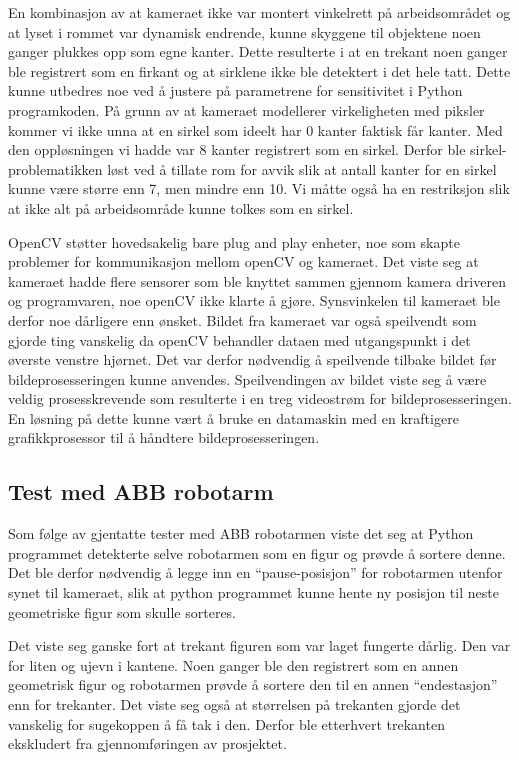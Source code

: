 \documentclass[conference]{IEEEtran}
\begin{document}
        En kombinasjon av at kameraet ikke var montert vinkelrett på arbeidsområdet og at lyset i rommet var dynamisk endrende, kunne skyggene til 
        objektene noen ganger plukkes opp som egne kanter. Dette resulterte i at en trekant noen ganger ble registrert som en firkant og at sirklene 
        ikke ble detektert i det hele tatt. Dette kunne utbedres noe ved å justere på parametrene for sensitivitet i Python programkoden. På grunn av 
        at kameraet modellerer virkeligheten med piksler kommer vi ikke unna at en sirkel som ideelt har 0 kanter faktisk får kanter. Med den 
        oppløsningen vi hadde var 8 kanter registrert som en sirkel. Derfor ble sirkel-problematikken løst ved å tillate rom for avvik slik at antall 
        kanter for en sirkel kunne være større enn 7, men mindre enn 10. Vi måtte også ha en restriksjon slik at ikke alt på arbeidsområde kunne tolkes 
        som en sirkel. 

        OpenCV støtter hovedsakelig bare plug and play enheter, noe som skapte problemer for kommunikasjon mellom openCV og kameraet. Det viste seg at 
        kameraet hadde flere sensorer som ble knyttet sammen gjennom kamera driveren og programvaren, noe openCV ikke klarte å gjøre. Synsvinkelen til 
        kameraet ble derfor noe dårligere enn ønsket. Bildet fra kameraet var også speilvendt som gjorde ting vanskelig da openCV behandler dataen med 
        utgangspunkt i det øverste venstre hjørnet. Det var derfor nødvendig å speilvende tilbake bildet før bildeprosesseringen kunne anvendes. 
        Speilvendingen av bildet viste seg å være veldig prosesskrevende som resulterte i en treg videostrøm for bildeprosesseringen. En løsning på dette 
        kunne vært å bruke en datamaskin med en kraftigere grafikkprosessor til å håndtere bildeprosesseringen. 

    \subsection{Test med ABB robotarm}
        Som følge av gjentatte tester med ABB robotarmen viste det seg at Python programmet detekterte selve robotarmen som en figur og prøvde å sortere 
        denne. Det ble derfor nødvendig å legge inn en “pause-posisjon” for robotarmen utenfor synet til kameraet, slik at python programmet kunne hente 
        ny posisjon til neste geometriske figur som skulle sorteres.

        Det viste seg ganske fort at trekant figuren som var laget fungerte dårlig. Den var for liten og ujevn i kantene. Noen ganger ble den registrert 
        som en annen geometrisk figur og robotarmen prøvde å sortere den til en annen “endestasjon” enn for trekanter. Det viste seg også at størrelsen 
        på trekanten gjorde det vanskelig for sugekoppen å få tak i den. Derfor ble etterhvert trekanten ekskludert fra gjennomføringen av prosjektet. 
\end{document}

